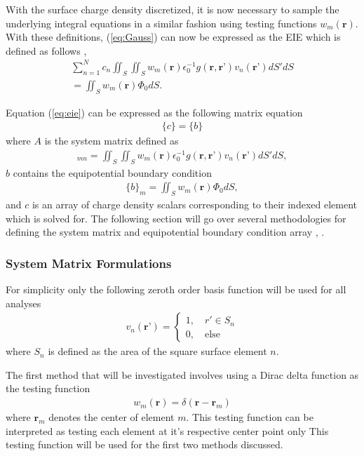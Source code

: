 With the surface charge density discretized, it is now necessary to sample the underlying integral equations in a similar fashion using testing functions $w_m(\textbf{r})$. With these definitions, (\ref{eq:Gauss}) can now be expressed as the EIE which is defined as follows \cite{rothlecnotes}, \cite{jin2011theory}
\begin{multline}
    \sum_{n=1}^{N}c_n\iint_S\iint_Sw_m(\textbf{r})\epsilon_0^{-1}g(\textbf{r},\textbf{r'})v_n(\textbf{r'})dS'dS \\ =\iint_Sw_m(\textbf{r})\Phi_0dS.
    \label{eq:eie}
\end{multline}

Equation (\ref{eq:eie}) can be expressed as the following matrix equation
\begin{align}
    [A]\{c\}=\{b\}
\end{align}
where $A$ is the system matrix defined as
\begin{align}
    [A]_{mn}=\iint_S\iint_Sw_m(\textbf{r})\epsilon_0^{-1}g(\textbf{r},\textbf{r'})v_n(\textbf{r'})dS'dS,
    \label{eq:a}
\end{align}
$b$ contains the equipotential boundary condition
\begin{align}
    \{b\}_m=\iint_Sw_m(\textbf{r})\Phi_0dS,
    \label{eq:b}
\end{align}
and ${c}$ is an array of charge density scalars corresponding to their indexed element which is solved for. The following section will go over several methodologies for defining the system matrix and equipotential boundary condition array \cite{rothlecnotes}, \cite{jin2011theory}.

\subsubsection{System Matrix Formulations}
\label{subsub:mat-form}

For simplicity only the following zeroth order basis function will be used for all analyses
\begin{align}
    v_n(\textbf{r'})=\begin{cases}
        1,\quad r'\in S_n\\
        0,\quad \mathrm{else}
    \end{cases}
\end{align}
where $S_n$ is defined as the area of the square surface element $n$.

The first method that will be investigated involves using a Dirac delta function as the testing function
\begin{align}
    w_m(\textbf{r})=\delta (\textbf{r}-\textbf{r}_m)
    \label{eq:Dirac}
\end{align} 
where $\textbf{r}_m$ denotes the center of element $m$. This testing function can be interpreted as testing each element at it's respective center point only \cite{rothlecnotes} This testing function will be used for the first two methods discussed.

